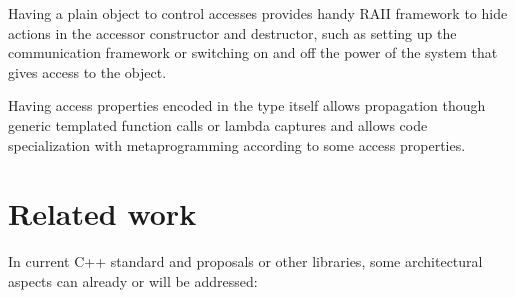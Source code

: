 \documentclass[a4paper]{article}
\begin{document}
Having a plain object to control accesses provides handy RAII
framework to hide actions in the accessor constructor and destructor,
such as setting up the communication framework or switching on and off
the power of the system that gives access to the object.

Having access properties encoded in the type itself allows propagation
though generic templated function calls or lambda captures and allows
code specialization with metaprogramming according to some access
properties.


\section{Related work}
\label{sec:related-work}

In current C++ standard and proposals or other libraries, some
architectural aspects can already or will be addressed:
\end{document}
